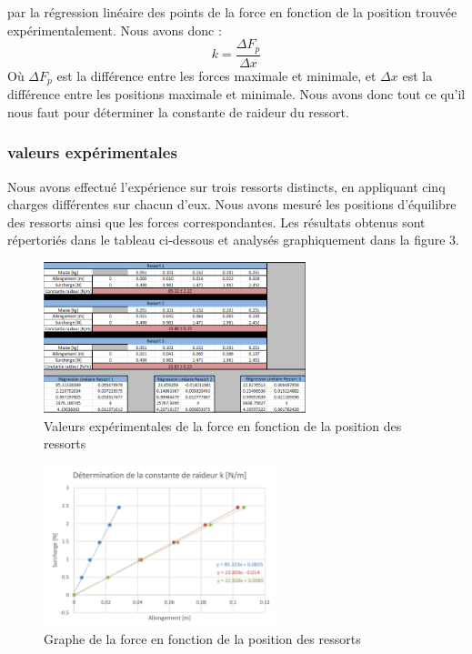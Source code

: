             par la régression linéaire des points de la force en fonction de la position trouvée
            expérimentalement. Nous avons donc :
            \begin{equation}
                k = \frac{\Delta F_p}{\Delta x}
            \end{equation}
            Où $\Delta F_p$ est la différence entre les forces maximale et minimale,
            et $\Delta x$ est la différence entre les positions maximale et minimale.
            \newline
            Nous avons donc tout ce qu'il nous faut pour déterminer la constante de raideur
            du ressort.

            \newpage

        \subsubsection{valeurs expérimentales}
        Nous avons effectué l’expérience sur trois ressorts distincts, en appliquant cinq charges 
        différentes sur chacun d’eux. Nous avons mesuré les positions d’équilibre des ressorts ainsi 
        que les forces correspondantes. Les résultats obtenus sont répertoriés dans le tableau ci-dessous 
        et analysés graphiquement dans la figure 3.
            \begin{figure}[h]
                \centering
                \includegraphics[width=0.68\textwidth]{images/tab_ressort.png}
                \caption{Valeurs expérimentales de la force en fonction de la position des ressorts}
            \end{figure}
            \hspace{1cm}
            \begin{figure}[h]
                \centering
                \includegraphics[width=0.6\textwidth]{images/graphe_k.PNG}
                \caption{Graphe de la force en fonction de la position des ressorts}
            \end{figure}

